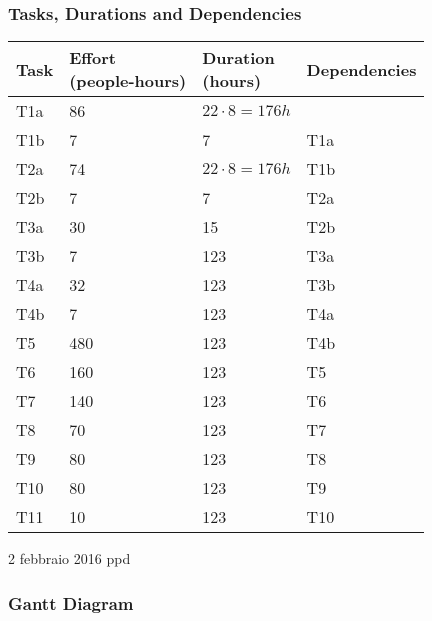 \subsubsection{Tasks, Durations and Dependencies}
\lipsum[100]
\begin{center}
	\begin{tabulary}{\linewidth\tymin=70pt}{Y{2cm}|Y{3cm}|Y{2cm}|Y{2cm}}
		\textbf{Task} & \textbf{Effort\newline(people-hours)} & \textbf{Duration\newline(hours)} & \textbf{Dependencies} \\ \hline
		T1a &  86 & $22 \cdot 8 = 176h$  & \\ \hline
		T1b & 7 & 7 & T1a \\ \hline
		T2a & 74 & $22 \cdot 8 = 176h$ & T1b \\ \hline
		T2b & 7 & 7 & T2a \\ \hline
		T3a & 30 & 15 & T2b \\ \hline
		T3b & 7 & 123 & T3a \\ \hline
		T4a & 32 & 123 & T3b \\ \hline
		T4b & 7 & 123 & T4a \\ \hline
		T5 & 480 & 123 & T4b \\ \hline
		T6 & 160 & 123 & T5 \\ \hline
		T7 & 140 & 123 & T6 \\ \hline
		T8 & 70 & 123 & T7 \\ \hline
		T9 & 80 & 123 & T8 \\ \hline
		T10 & 80 & 123 & T9 \\ \hline
		T11 & 10 & 123 & T10 \\ \hline
	\end{tabulary}
	
	2 febbraio 2016 ppd
\end{center}
%
\subsubsection{Gantt Diagram}
\lipsum[100]
\begin{center}
	\begin{ganttchart}[hgrid=true, vgrid={*3{none}, dotted}, x unit=1.7mm]{1}{60}
		  \\
		  \\
		 \\
		 \\
		 \\
		 \\
		 \\
	\end{ganttchart}
\end{center}
%